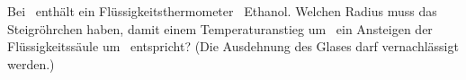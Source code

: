Bei \TNtO\ enthält ein Flüssigkeitsthermometer \VEtO\ Ethanol. Welchen Radius muss das Steigröhrchen haben, damit einem Temperaturanstieg um \dTtO\ ein Ansteigen der Flüssigkeitssäule um \dhTO\ entspricht? (Die Ausdehnung des Glases darf vernachlässigt werden.)
